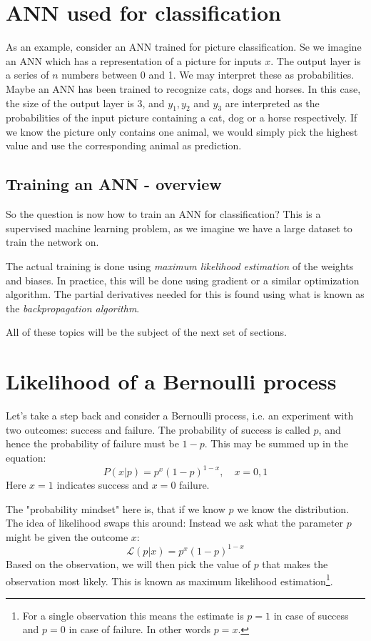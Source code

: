 \documentclass[12pt, a4paper]{article}
\numberwithin{equation}{section}
\begin{document}
\section{ANN used for classification}
As an example, consider an ANN trained for picture classification. Se we imagine an ANN which has a representation of a picture for inputs $x$. The output layer is a series of $n$ numbers between 0 and 1. We may interpret these as probabilities. Maybe an ANN has been trained to recognize cats, dogs and horses. In this case, the size of the output layer is 3, and $y_1, y_2$ and $y_3$ are interpreted as the probabilities of the input picture containing a cat, dog or a horse respectively. If we know the picture only contains one animal, we would simply pick the highest value and use the corresponding animal as prediction.

\subsection{Training an ANN - overview}
So the question is now how to train an ANN for classification? This is a supervised machine learning problem, as we imagine we have a large dataset to train the network on.

The actual training is done using \textit{maximum likelihood estimation} of the weights and biases. In practice, this will be done using gradient or a similar optimization algorithm. The partial derivatives needed for this is found using what is known as the \textit{backpropagation algorithm}.

All of these topics will be the subject of the next set of sections.

\section{Likelihood of a Bernoulli process}
Let's take a step back and consider a Bernoulli process, i.e. an experiment with two outcomes: success and failure. The probability of success is called $p$, and hence the probability of failure must be $1-p$. This may be summed up in the equation:
\begin{equation}
P(x|p)=p^x(1-p)^{1-x},\quad x=0,1
\end{equation}
Here $x=1$ indicates success and $x=0$ failure.

The "probability mindset" here is, that if we know $p$ we know the distribution. The idea of likelihood swaps this around: Instead we ask what the parameter $p$ might be given the outcome $x$:
\begin{equation}
\mathcal{L}(p|x)=p^x(1-p)^{1-x}
\end{equation}
Based on the observation, we will then pick the value of $p$ that makes the observation most likely. This is known as maximum likelihood estimation\footnote{For a single observation this means the estimate is $p=1$ in case of success and $p=0$ in case of failure. In other words $p=x$.}.
\end{document}
